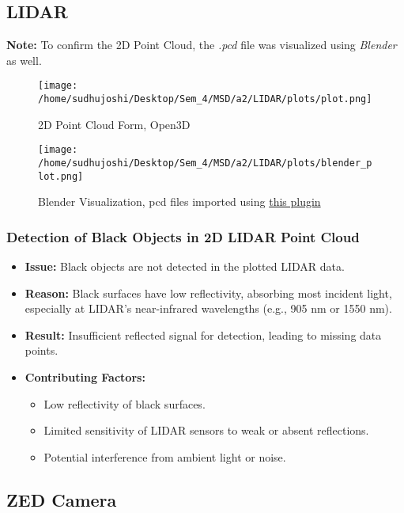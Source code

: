 \documentclass[a4paper]{article}
\begin{document}
\subsection{LIDAR}
\textbf{Note:} To confirm the 2D Point Cloud, the \textit{.pcd} file was visualized using \textit{Blender} as well.
\begin{figure}[H]
    \centering
    \texttt{[image: /home/sudhujoshi/Desktop/Sem\_4/MSD/a2/LIDAR/plots/plot.png]}
    \caption{2D Point Cloud Form, Open3D} 
\end{figure}
\begin{figure}[H]
    \centering
    \texttt{[image: /home/sudhujoshi/Desktop/Sem\_4/MSD/a2/LIDAR/plots/blender\_plot.png]}
    \caption{Blender Visualization, pcd files imported using \href{https://github.com/MarkHedleyJones/blender-pcd-io/tree/master/io_pcd}{this plugin}}
\end{figure}

\subsubsection*{Detection of Black Objects in 2D LIDAR Point Cloud}
\begin{itemize}
    \item \textbf{Issue:} Black objects are not detected in the plotted LIDAR data.
    \item \textbf{Reason:} Black surfaces have low reflectivity, absorbing most incident light, especially at LIDAR's near-infrared wavelengths (e.g., 905 nm or 1550 nm).
    \item \textbf{Result:} Insufficient reflected signal for detection, leading to missing data points.
    \item \textbf{Contributing Factors:}
    \begin{itemize}
        \item Low reflectivity of black surfaces.
        \item Limited sensitivity of LIDAR sensors to weak or absent reflections.
        \item Potential interference from ambient light or noise.
    \end{itemize}
\end{itemize}

\subsection{ZED Camera}
\end{document}
